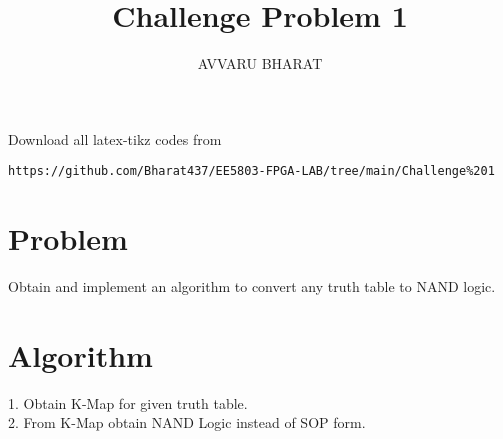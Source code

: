 \documentclass{article}
\begin{document}
     \def\rightbox#1{\makebox[0in][r]{#1}}
     \def\centbox#1{\makebox[0in]{#1}}
     \def\topbox#1{\raisebox{-\baselineskip}[0in][0in]{#1}}
     \def\midbox#1{\raisebox{-0.5\baselineskip}[0in][0in]{#1}}
\vspace{3cm}
\title{Challenge Problem 1}
\author{AVVARU BHARAT}
\date{}
\maketitle
\renewcommand\thefigure{\arabic{figure}}
\setcounter{figure}{0}
\renewcommand{\thetable}{\arabic{table}}
\setcounter{table}{0}
Download all latex-tikz codes from 
%
\begin{lstlisting}
https://github.com/Bharat437/EE5803-FPGA-LAB/tree/main/Challenge%201
\end{lstlisting}
%
\section{Problem}
Obtain and implement an algorithm to convert any truth table to NAND logic.
\section{Algorithm}
1. Obtain K-Map for given truth table.\\
2. From K-Map obtain NAND Logic instead of SOP form.
\end{document}
